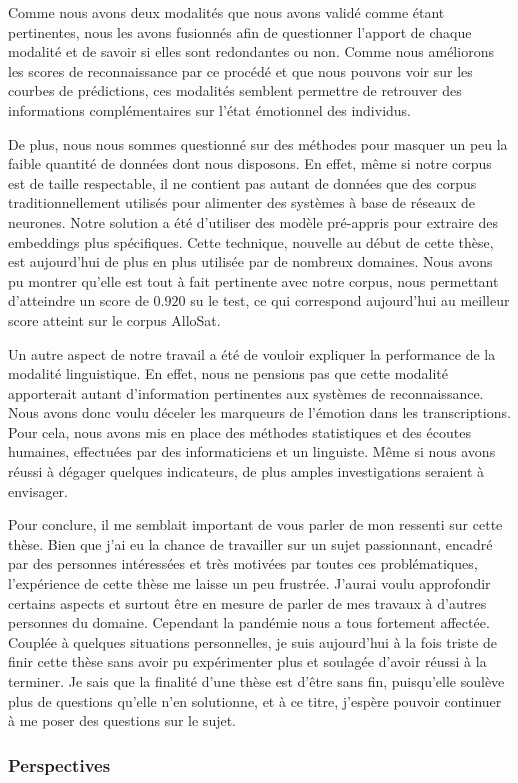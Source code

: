Comme nous avons deux modalités que nous avons validé comme étant pertinentes, nous les avons fusionnés afin de questionner l'apport de chaque modalité et de savoir si elles sont redondantes ou non. Comme nous améliorons les scores de reconnaissance par ce procédé et que nous pouvons voir sur les courbes de prédictions, ces modalités semblent permettre de retrouver des informations complémentaires sur l'état émotionnel des individus.

De plus, nous nous sommes questionné sur des méthodes pour masquer un peu la faible quantité de données dont nous disposons. En effet, même si notre corpus est de taille respectable, il ne contient pas autant de données que des corpus traditionnellement utilisés pour alimenter des systèmes à base de réseaux de neurones. Notre solution a été d'utiliser des modèle pré-appris pour extraire des embeddings plus spécifiques. Cette technique, nouvelle au début de cette thèse, est aujourd'hui de plus en plus utilisée par de nombreux domaines. Nous avons pu montrer qu'elle est tout à fait pertinente avec notre corpus, nous permettant d’atteindre un score de $0.920$ su le test, ce qui correspond aujourd'hui au meilleur score atteint sur le corpus AlloSat.

Un autre aspect de notre travail a été de vouloir expliquer la performance de la modalité linguistique. En effet, nous ne pensions pas que cette modalité apporterait autant d'information pertinentes aux systèmes de reconnaissance. Nous avons donc voulu déceler les marqueurs de l'émotion dans les transcriptions. Pour cela, nous avons mis en place des méthodes statistiques et des écoutes humaines, effectuées par des informaticiens et un linguiste. Même si nous avons réussi à dégager quelques indicateurs, de plus amples investigations seraient à envisager.

Pour conclure, il me semblait important de vous parler de mon ressenti sur cette thèse. Bien que j'ai eu la chance de travailler sur un sujet passionnant, encadré par des personnes intéressées et très motivées par toutes ces problématiques, l'expérience de cette thèse me laisse un peu frustrée. J'aurai voulu approfondir certains aspects et surtout être en mesure de parler de mes travaux à d'autres personnes du domaine. Cependant la pandémie nous a tous fortement affectée. Couplée à quelques situations personnelles, je suis aujourd'hui à la fois triste de finir cette thèse sans avoir pu expérimenter plus et soulagée d'avoir réussi à la terminer. Je sais que la finalité d'une thèse est d'être sans fin, puisqu'elle soulève plus de questions qu'elle n'en solutionne, et à ce titre, j'espère pouvoir continuer à me poser des questions sur le sujet.

\subsubsection{Perspectives}

